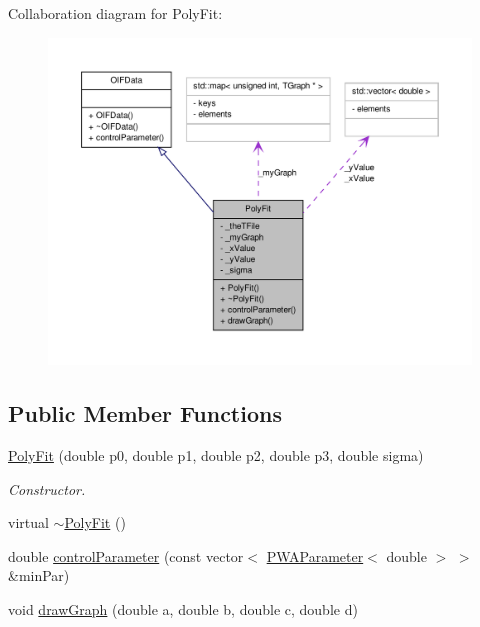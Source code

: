 Collaboration diagram for PolyFit:\nopagebreak
\begin{figure}[H]
\begin{center}
\leavevmode
\includegraphics[width=400pt]{d6/d22/classPolyFit__coll__graph}
\end{center}
\end{figure}
\subsection*{Public Member Functions}
\begin{DoxyCompactItemize}
\item 
\hyperlink{classPolyFit_abfc9528462669ea53ce08e4945c4ce99}{PolyFit} (double p0, double p1, double p2, double p3, double sigma)
\begin{DoxyCompactList}\small\item\em Constructor. \end{DoxyCompactList}\item 
virtual \hyperlink{classPolyFit_a3462736e02f02d3ab46ccd64aaf235d3}{$\sim$PolyFit} ()
\item 
double \hyperlink{classPolyFit_a2f8bf8460f31aef010e67950c3db0c82}{controlParameter} (const vector$<$ \hyperlink{classPWAParameter}{PWAParameter}$<$ double $>$ $>$ \&minPar)
\item 
void \hyperlink{classPolyFit_ad90dd471fea18051d5c0c2e5b483f0a5}{drawGraph} (double a, double b, double c, double d)
\end{DoxyCompactItemize}
